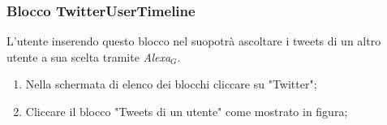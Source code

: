 \subsubsection{Blocco TwitterUserTimeline} \label{twitterU}
L'utente inserendo questo blocco nel suopotrà ascoltare i tweets di un altro utente a sua scelta tramite \textit{Alexa$_{G}$}.
\begin{enumerate}
	\item Nella schermata di elenco dei blocchi cliccare su "Twitter";
	\item Cliccare il blocco "Tweets di un utente" come mostrato in figura;
	\begin{figure}[!ht]
		\centering

\end{figure}
\end{enumerate}
